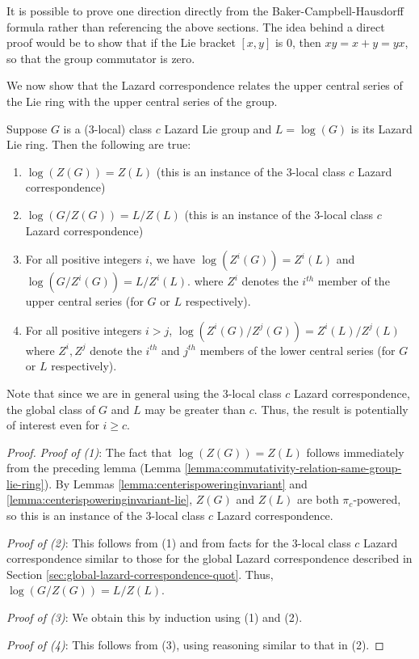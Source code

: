 It is possible to prove one direction directly from the
Baker-Campbell-Hausdorff formula rather than referencing the above
sections. The idea behind a direct proof would be to show that if the
Lie bracket $[x,y]$ is $0$, then $xy = x + y = yx$, so that the group
commutator is zero.

We now show that the Lazard correspondence relates the upper central
series of the Lie ring with the upper central series of the group.

\begin{theorem}
  Suppose $G$ is a ($3$-local) class $c$ Lazard Lie group and $L =
  \log(G)$ is its Lazard Lie ring. Then the following are true:

  \begin{enumerate}
  \item $\log(Z(G)) = Z(L)$ (this is an instance of the $3$-local
    class $c$ Lazard correspondence)
  \item $\log(G/Z(G)) = L/Z(L)$ (this is an instance of the $3$-local
    class $c$ Lazard correspondence)
  \item For all positive integers $i$, we have $\log(Z^i(G)) = Z^i(L)$
    and $\log(G/Z^i(G)) = L/Z^i(L)$.  where $Z^i$ denotes the $i^{th}$
    member of the upper central series (for $G$ or $L$ respectively).
  \item For all positive integers $i > j$, $\log(Z^i(G)/Z^j(G)) =
    Z^i(L)/Z^j(L)$ where $Z^i,Z^j$ denote the $i^{th}$ and $j^{th}$
    members of the lower central series (for $G$ or $L$ respectively).
  \end{enumerate}
\end{theorem}

Note that since we are in general using the $3$-local class $c$ Lazard
correspondence, the global class of $G$ and $L$ may be greater than
$c$. Thus, the result is potentially of interest even for $i \ge c$.

\begin{proof}
  {\em Proof of (1)}: The fact that $\log(Z(G)) = Z(L)$ follows
  immediately from the preceding lemma (Lemma
  \ref{lemma:commutativity-relation-same-group-lie-ring}). By Lemmas
  \ref{lemma:centerispoweringinvariant} and
  \ref{lemma:centerispoweringinvariant-lie}, $Z(G)$ and $Z(L)$ are
  both $\pi_c$-powered, so this is an instance of the $3$-local class
  $c$ Lazard correspondence.

  {\em Proof of (2)}: This follows from (1) and from facts for the
  $3$-local class $c$ Lazard correspondence similar to those for the
  global Lazard correspondence described in Section
  \ref{sec:global-lazard-correspondence-quot}.  Thus, $\log(G/Z(G)) =
  L/Z(L)$.

  {\em Proof of (3)}: We obtain this by induction using (1) and (2).

  {\em Proof of (4)}: This follows from (3), using reasoning similar
  to that in (2).
\end{proof}

